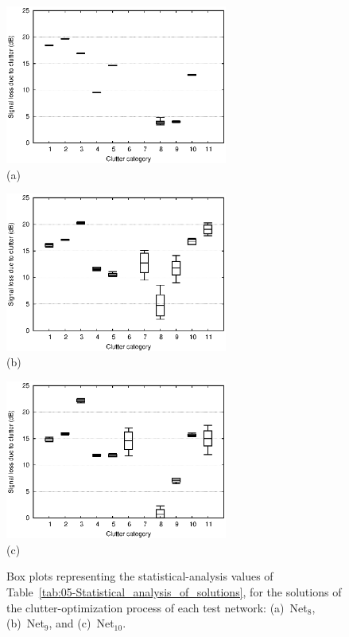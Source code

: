 \begin{figure}
\centering

\includegraphics[width=0.65\textwidth]{05-framework_parameter_tuning/img/boxplot-rural}\\\hspace*{0.2in}(a)

\includegraphics[width=0.65\textwidth]{05-framework_parameter_tuning/img/boxplot-urban}\\\hspace*{0.2in}(b)

\includegraphics[width=0.65\textwidth]{05-framework_parameter_tuning/img/boxplot-hilly}\\\hspace*{0.2in}(c)

\caption{Box plots representing the statistical-analysis values of Table~\ref{tab:05-Statistical_analysis_of_solutions},
for the solutions of the clutter-optimization process of each test
network: (a)~Net$_{8}$, (b)~Net$_{9}$, and (c)~Net$_{10}$.\label{fig:05-Statistical_analysis_boxplots}}
\end{figure}


